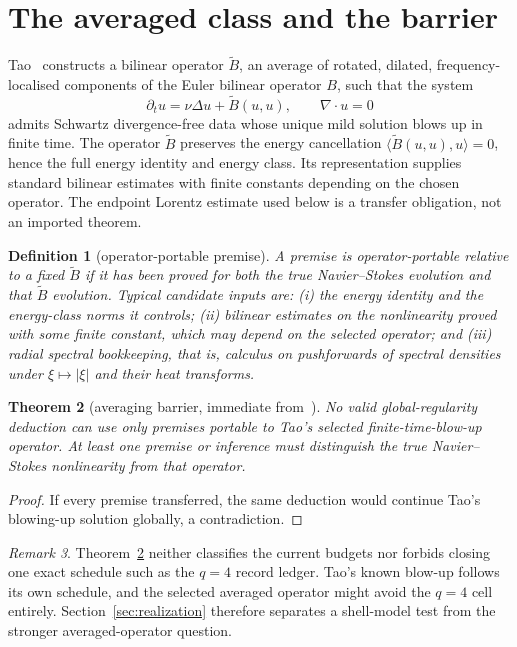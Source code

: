 \documentclass[11pt]{article}
\newtheorem{theorem}{Theorem}
\newtheorem{definition}[theorem]{Definition}
\theoremstyle{remark}
\newtheorem{remark}[theorem]{Remark}
\begin{document}
\section{The averaged class and the barrier}

Tao~\cite{Tao16} constructs a bilinear operator \(\tilde B\), an
average of rotated, dilated, frequency-localised components of the
Euler bilinear operator \(B\), such that the system
\begin{equation}
 \partial_tu=\nu\Delta u+\tilde B(u,u),
 \qquad
 \nabla\cdot u=0
 \label{eq:averaged}
\end{equation}
admits Schwartz divergence-free data whose unique mild solution blows
up in finite time.  The operator \(\tilde B\) preserves the energy
cancellation \(\langle\tilde B(u,u),u\rangle=0\), hence the full energy
identity and energy class.  Its representation supplies standard
bilinear estimates with finite constants depending on the chosen
operator.  The endpoint Lorentz estimate used below is a transfer
obligation, not an imported theorem.

\begin{definition}[operator-portable premise]
\label{def:portable}
A premise is \emph{operator-portable relative to a fixed
\(\tilde B\)} if it has been proved for both the true Navier--Stokes
evolution and that \(\tilde B\) evolution.  Typical candidate inputs are:
(i) the energy identity and the energy-class norms it controls;
(ii) bilinear estimates on the nonlinearity proved with some finite
constant, which may depend on the selected operator; and
(iii) radial spectral bookkeeping, that is, calculus on pushforwards of
spectral densities under \(\xi\mapsto|\xi|\) and their heat transforms.
\end{definition}

\begin{theorem}[averaging barrier, immediate from~\cite{Tao16}]
\label{thm:barrier}
No valid global-regularity deduction can use only premises portable to
Tao's selected finite-time-blow-up operator.  At least one premise or
inference must distinguish the true Navier--Stokes nonlinearity from
that operator.
\end{theorem}

\begin{proof}
If every premise transferred, the same deduction would continue Tao's
blowing-up solution globally, a contradiction.
\end{proof}

\begin{remark}
Theorem~\ref{thm:barrier} neither classifies the current budgets nor
forbids closing one exact schedule such as the \(q=4\) record ledger.
Tao's known blow-up follows its own schedule, and the selected averaged
operator might avoid the \(q=4\) cell entirely.  Section~\ref{sec:realization}
therefore separates a shell-model test from the stronger
averaged-operator question.
\end{remark}
\end{document}
